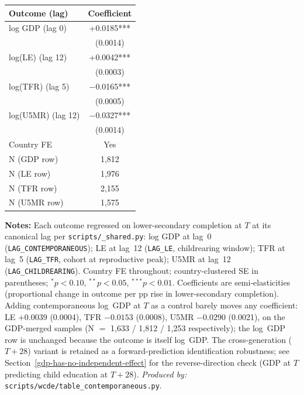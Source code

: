 \documentclass[12pt,letterpaper]{article}
\begin{document}
{\small\setlength{\tabcolsep}{3pt}
\begin{longtable}[]{@{}lc@{}}
\toprule
Outcome (lag)         & Coefficient \\
\midrule
\endhead
log GDP (lag 0)       & +0.0185*** \\
                      & (0.0014)   \\
log(LE) (lag 12)      & +0.0042*** \\
                      & (0.0003)   \\
log(TFR) (lag 5)      & $-$0.0165*** \\
                      & (0.0005)   \\
log(U5MR) (lag 12)    & $-$0.0327*** \\
                      & (0.0014)   \\
\midrule
Country FE            & Yes \\
N (GDP row)           & 1{,}812 \\
N (LE row)            & 1{,}976 \\
N (TFR row)           & 2{,}155 \\
N (U5MR row)          & 1{,}575 \\
\bottomrule
\end{longtable}}\addtocounter{table}{-1}%

\begin{minipage}{\dimexpr\textwidth-2em}
\scriptsize
\textbf{Notes:} Each outcome regressed on lower-secondary completion
at $T$ at its canonical lag per \texttt{scripts/\_shared.py}: log
GDP at lag~0 (\texttt{LAG\_CONTEMPORANEOUS}); LE at lag~12
(\texttt{LAG\_LE}, childrearing window); TFR at lag~5
(\texttt{LAG\_TFR}, cohort at reproductive peak); U5MR at lag~12
(\texttt{LAG\_CHILDREARING}). Country FE throughout;
country-clustered SE in parentheses; $^{*}p<0.10$, $^{**}p<0.05$,
$^{***}p<0.01$. Coefficients are semi-elasticities (proportional
change in outcome per pp rise in lower-secondary completion).
Adding contemporaneous log~GDP at $T$ as a control barely moves any
coefficient: LE $+0.0039$ (0.0004), TFR $-0.0153$ (0.0008), U5MR
$-0.0290$ (0.0021), on the GDP-merged samples (N $=$ 1{,}633 / 1{,}812
/ 1{,}253 respectively); the log~GDP row is unchanged because the
outcome is itself log~GDP. The
cross-generation ($T{+}28$) variant is retained as a
forward-prediction identification robustness; see
Section~\ref{gdp-has-no-independent-effect} for the reverse-direction
check (GDP at $T$ predicting child education at $T{+}28$).
\textit{Produced by:} \texttt{scripts/wcde/table\_contemporaneous.py}.
\end{minipage}
\end{document}
